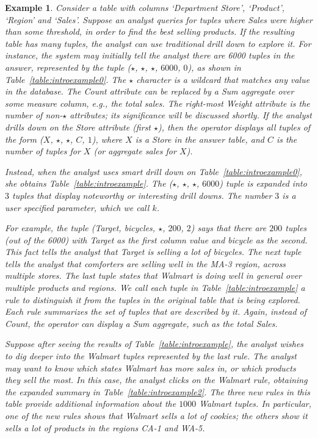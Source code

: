 \documentclass[10pt,journal,compsoc]{IEEEtran}
\newtheorem{example}[definition]{Example}
\begin{document}
\begin{example}\label{ex:introexample}
Consider a table with columns `Department Store', `Product', `Region'
and `Sales'. Suppose an analyst queries for tuples
where Sales were higher than some threshold, in order
to find the best selling products.
If the resulting table has many tuples,
the analyst can use traditional drill down to explore it.
For instance, the system may initially tell the analyst there are
6000 tuples in the answer, represented by the tuple ($\star$, $\star$, $\star$, $6000$, $0$),
as shown in Table~\ref{table:introexample0}.
The $\star$ character is a wildcard that matches any value in the database.
The Count attribute can be replaced by a Sum aggregate over some measure column,
e.g., the total sales.
The right-most Weight attribute is the number of non-$\star$ attributes; 
its significance will be discussed shortly.
If the analyst drills down on the Store attribute (first $\star$),
then the operator displays all tuples of the form ($X$, $\star$, $\star$, $C$, $1$),
where $X$ is a Store in the answer table, and $C$
is the number of tuples for $X$ (or aggregate sales for $X$).

Instead, when the analyst uses smart drill down on Table~\ref{table:introexample0},
she obtains Table~\ref{table:introexample}.
The ($\star$, $\star$, $\star$, $6000$) tuple is expanded into $3$ tuples
that display noteworthy or interesting drill downs.
The number $3$ is a user specified parameter, which we call $k$.

For example, the tuple (Target, bicycles, $\star$, $200$, $2$)
says that there are $200$ tuples (out of the 6000) with
Target as the first column value and bicycle as the second.
This fact tells the analyst that Target is selling a lot of bicycles.
The next tuple tells the analyst that comforters are selling well in
the MA-3 region, across multiple stores. The last tuple
states that Walmart is doing well in general over multiple products and regions.
We call each tuple in Table~\ref{table:introexample} a {\em rule}
to distinguish it from the tuples in the original table that is being explored.
Each rule summarizes the set of tuples that are described by it.
Again, instead of Count, the operator can display a Sum aggregate, such as
the total Sales.


Suppose after seeing the results of Table~\ref{table:introexample},
the analyst wishes to dig deeper into the Walmart tuples
represented by the last rule.
The analyst may want to know
which states Walmart has more sales in, or which products they sell
the most. In this case, the analyst clicks on the Walmart rule,
obtaining the expanded summary in Table~\ref{table:introexample2}.
The three new rules in this table provide additional information
about the $1000$ Walmart tuples.
In particular, one of the new rules shows that
Walmart sells a lot of cookies; the others show it sells a lot of products in
the regions CA-1 and WA-5.


\end{example}
\end{document}
